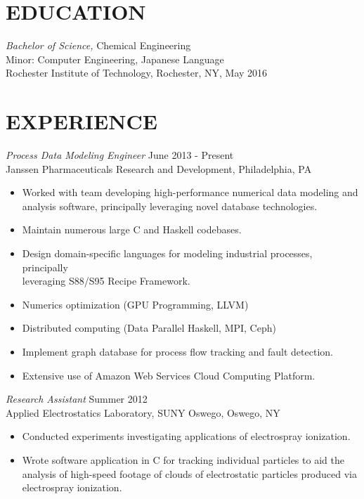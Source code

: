 \documentclass[line,margin]{res}
\begin{document}
\address{262 Academy Street, Mexico, NY 13114}
\address{(315) 391-7268 \texttt{|} pi.boy.travis@gmail.com}

\begin{resume}

\section{EDUCATION} {\sl Bachelor of Science,} Chemical Engineering\\
Minor: Computer Engineering, Japanese Language \\
Rochester Institute of Technology, Rochester, NY, May 2016 \\

\section{EXPERIENCE} {\sl Process Data Modeling Engineer} \hfill June 2013 - Present \\
		Janssen Pharmaceuticals Research and Development,
		Philadelphia, PA
		\begin{itemize}  \itemsep -2pt
		\item   Worked with team developing high-performance numerical data modeling and analysis software, principally leveraging novel database technologies.
		\item   Maintain numerous large C and Haskell codebases.
		\item   Design domain-specific languages for modeling industrial processes, principally \\leveraging S88/S95 Recipe Framework.
		\item   Numerics optimization (GPU Programming, LLVM)
		\item   Distributed computing (Data Parallel Haskell, MPI, Ceph)
		\item   Implement graph database for process flow tracking and fault detection.
		\item   Extensive use of Amazon Web Services Cloud Computing Platform.
		\end{itemize}

                {\sl Research Assistant} \hfill Summer 2012 \\
                Applied Electrostatics Laboratory,
                SUNY Oswego, Oswego, NY
                 \begin{itemize}  \itemsep -2pt %
                \item   Conducted experiments investigating applications of electrospray ionization.
		\item   Wrote software application in C
			for tracking individual particles
			to aid the analysis of high-speed footage
			of clouds of electrostatic particles
			produced via electrospray ionization.
                \end{itemize}


\end{resume}
\end{document}
